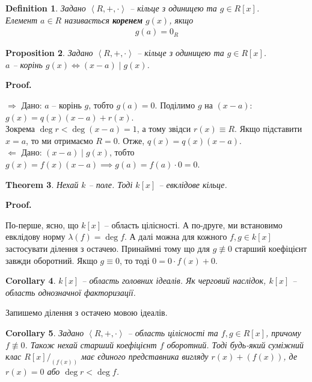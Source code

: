\documentclass[a4paper, 10pt]{article}
\makeatletter
\def\rightproof{$\boxed{\Rightarrow}$ }
\def\leftproof{$\boxed{\Leftarrow}$ }
\theoremstyle{theoremdd}
\newtheorem{theorem}{Theorem}[subsection]
\theoremstyle{theoremdd}
\newtheorem{definition}[theorem]{Definition}
\theoremstyle{theoremdd}
\theoremstyle{theoremdd}
\theoremstyle{theoremdd}
\theoremstyle{theoremdd}
\theoremstyle{theoremdd}
\theoremstyle{theoremdd}
\theoremstyle{theoremdd}
\newtheorem{proposition}[theorem]{Proposition}
\theoremstyle{theoremdd}
\theoremstyle{theoremdd}
\theoremstyle{theoremdd}
\theoremstyle{theoremdd}
\theoremstyle{theoremdd}
\newtheorem{corollary}[theorem]{Corollary}
\theoremstyle{theoremdd}
\renewenvironment{proof}[1][Proof.\\]{\par
\pushQED{\hfill \qed}%
\normalfont \topsep6\p@\@plus6\p@\relax
\trivlist
\item\relax
{\bfseries
#1\@addpunct{.}}\hspace\labelsep\ignorespaces
}{%
\popQED\endtrivlist\@endpefalse
}
\makeatother
\begin{document}
\begin{definition}
Задано $\left< R,+,\cdot\right>$ -- кільце з одиницею та $g \in R[x]$.\\
Елемент $a \in R$ називається \textbf{коренем} $g(x)$, якщо 
\begin{align*}
g(a) = 0_R
\end{align*}
\end{definition}

\begin{proposition}
Задано $\left< R,+,\cdot\right>$ -- кільце з одиницею та $g \in R[x]$.\\
$a$ -- корінь $g(x) \iff (x-a) \mid g(x)$.
\end{proposition}

\begin{proof}
\rightproof Дано: $a$ -- корінь $g$, тобто $g(a) = 0$. Поділимо $g$ на $(x-a)$:\\
$g(x) = q(x)(x-a) + r(x)$.\\
Зокрема $\deg r < \deg (x-a) = 1$, а тому звідси $r(x) \equiv R$. Якщо підставити $x = a$, то ми отримаємо $R = 0$. Отже, $q(x) = q(x)(x-a)$.
\bigskip \\
\leftproof Дано: $(x-a) \mid g(x)$, тобто \\
$g(x) = f(x)(x-a) \implies g(a) = f(a) \cdot 0 = 0$.
\end{proof}

\begin{theorem}
Нехай $k$ -- поле. Тоді $k[x]$ -- евклідове кільце.
\end{theorem}

\begin{proof}
По-перше, ясно, що $k[x]$ -- область цілісності. А по-друге, ми встановимо евклідову норму $\lambda(f) = \deg f$. А далі можна для кожного $f,g \in k[x]$ застосувати ділення з остачею. Принаймні тому що для $g \not\equiv 0$ старший коефіцієнт завжди оборотний. Якщо $g \equiv 0$, то тоді $0 = 0 \cdot f(x) + 0$.
\end{proof}

\begin{corollary}
$k[x]$ -- область головних ідеалів. Як черговий наслідок, $k[x]$ -- область однозначної факторизації.
\end{corollary}

Запишемо ділення з остачею мовою ідеалів.
\begin{corollary}
Задано $\left< R,+,\cdot\right>$ -- область цілісності та $f,g \in R[x]$, причому $f \not\equiv 0$. Також нехай старший коефіцієнт $f$ оборотний. Тоді будь-який суміжний клас $R[x]/_{(f(x))}$ має єдиного представника вигляду $r(x) + (f(x))$, де $r(x) = 0$ або $\deg r < \deg f$.
\end{corollary}
\end{document}
